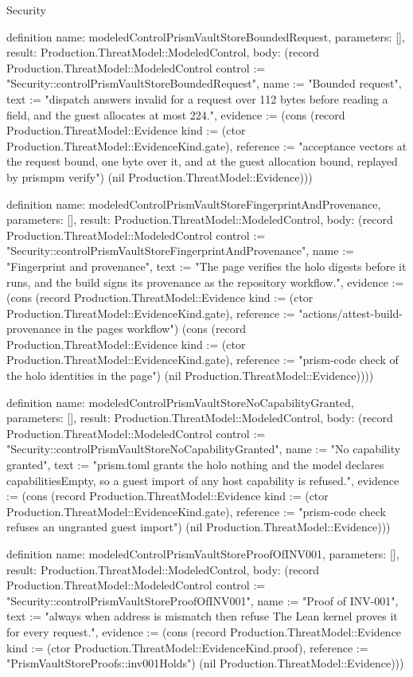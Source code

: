 \begin{lexlean}{Security}
\begin{semanticmodule}
definition{
  name: modeledControlPrismVaultStoreBoundedRequest,
  parameters: [],
  result: Production.ThreatModel::ModeledControl,
  body: (record Production.ThreatModel::ModeledControl {control := "Security::controlPrismVaultStoreBoundedRequest", name := "Bounded request", text := "dispatch answers invalid for a request over 112 bytes before reading a field, and the guest allocates at most 224.", evidence := (cons (record Production.ThreatModel::Evidence {kind := (ctor Production.ThreatModel::EvidenceKind.gate), reference := "acceptance vectors at the request bound, one byte over it, and at the guest allocation bound, replayed by prismpm verify"}) (nil Production.ThreatModel::Evidence))})
}

definition{
  name: modeledControlPrismVaultStoreFingerprintAndProvenance,
  parameters: [],
  result: Production.ThreatModel::ModeledControl,
  body: (record Production.ThreatModel::ModeledControl {control := "Security::controlPrismVaultStoreFingerprintAndProvenance", name := "Fingerprint and provenance", text := "The page verifies the holo digests before it runs, and the build signs its provenance as the repository workflow.", evidence := (cons (record Production.ThreatModel::Evidence {kind := (ctor Production.ThreatModel::EvidenceKind.gate), reference := "actions/attest-build-provenance in the pages workflow"}) (cons (record Production.ThreatModel::Evidence {kind := (ctor Production.ThreatModel::EvidenceKind.gate), reference := "prism-code check of the holo identities in the page"}) (nil Production.ThreatModel::Evidence)))})
}

definition{
  name: modeledControlPrismVaultStoreNoCapabilityGranted,
  parameters: [],
  result: Production.ThreatModel::ModeledControl,
  body: (record Production.ThreatModel::ModeledControl {control := "Security::controlPrismVaultStoreNoCapabilityGranted", name := "No capability granted", text := "prism.toml grants the holo nothing and the model declares capabilitiesEmpty, so a guest import of any host capability is refused.", evidence := (cons (record Production.ThreatModel::Evidence {kind := (ctor Production.ThreatModel::EvidenceKind.gate), reference := "prism-code check refuses an ungranted guest import"}) (nil Production.ThreatModel::Evidence))})
}

definition{
  name: modeledControlPrismVaultStoreProofOfINV001,
  parameters: [],
  result: Production.ThreatModel::ModeledControl,
  body: (record Production.ThreatModel::ModeledControl {control := "Security::controlPrismVaultStoreProofOfINV001", name := "Proof of INV-001", text := "always when address is mismatch then refuse The Lean kernel proves it for every request.", evidence := (cons (record Production.ThreatModel::Evidence {kind := (ctor Production.ThreatModel::EvidenceKind.proof), reference := "PrismVaultStoreProofs::inv001Holds"}) (nil Production.ThreatModel::Evidence))})
}


\end{semanticmodule}
\end{lexlean}
